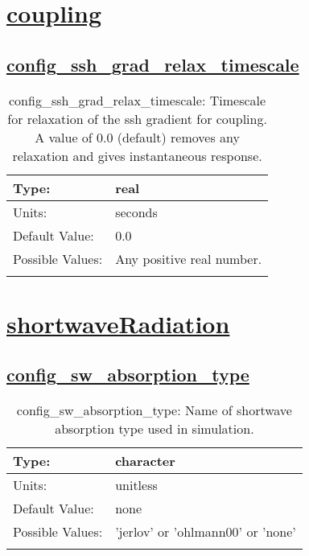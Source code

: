 \section[coupling]{\hyperref[sec:nm_tab_coupling]{coupling}}
\label{sec:nm_sec_coupling}
\subsection[config\_ssh\_grad\_relax\_timescale]{\hyperref[sec:nm_tab_coupling]{config\_ssh\_grad\_relax\_timescale}}
\label{subsec:nm_sec_config_ssh_grad_relax_timescale}
\begin{center}
\begin{longtable}{| p{2.0in} || p{4.0in} |}
    \hline
    Type: & real \\
    \hline
    Units: & \si{seconds} \\
    \hline
    Default Value: & 0.0 \\
    \hline
    Possible Values: & Any positive real number. \\
    \hline
    \caption{config\_ssh\_grad\_relax\_timescale: Timescale for relaxation of the ssh gradient for coupling. A value of 0.0 (default) removes any relaxation and gives instantaneous response.}
\end{longtable}
\end{center}
\section[shortwaveRadiation]{\hyperref[sec:nm_tab_shortwaveRadiation]{shortwaveRadiation}}
\label{sec:nm_sec_shortwaveRadiation}
\subsection[config\_sw\_absorption\_type]{\hyperref[sec:nm_tab_shortwaveRadiation]{config\_sw\_absorption\_type}}
\label{subsec:nm_sec_config_sw_absorption_type}
\begin{center}
\begin{longtable}{| p{2.0in} || p{4.0in} |}
    \hline
    Type: & character \\
    \hline
    Units: & \si{unitless} \\
    \hline
    Default Value: & none \\
    \hline
    Possible Values: & 'jerlov' or 'ohlmann00' or 'none' \\
    \hline
    \caption{config\_sw\_absorption\_type: Name of shortwave absorption type used in simulation. }
\end{longtable}
\end{center}
